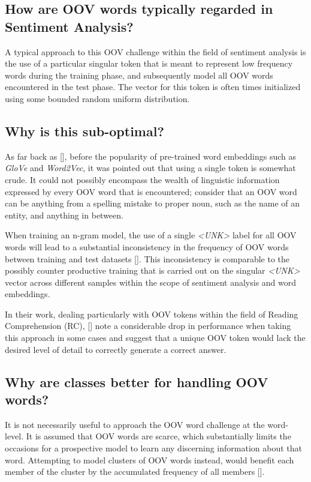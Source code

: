 \documentclass[12pt, a4paper]{report}
\newcommand{\unk}{\textit{\textless{UNK}\textgreater} }
\theoremstyle{definition}
\theoremstyle{definition}%
\theoremstyle{definition}%
\theoremstyle{definition}%
\theoremstyle{definition}%
\theoremstyle{definition}%
\renewcommand{\cite}[1]{[\citealp{#1}]}
\begin{document}
\subsection{How are OOV words typically regarded in Sentiment Analysis?}
A typical approach to this OOV challenge within the field of sentiment analysis is the use of a particular singular token that is meant to represent low frequency words during the training phase, and subsequently model all OOV words encountered in the test phase. The vector for this token is often times initialized using some bounded random uniform distribution.

\subsection{Why is this sub-optimal?}
As far back as \cite{gallwitz1996}, before the popularity of pre-trained word embeddings such as \textit{GloVe} and \textit{Word2Vec}, it was pointed out that using a single token is somewhat crude. It could not possibly encompass the wealth of linguistic information expressed by every OOV word that is encountered; consider that an OOV word can be anything from a spelling mistake to proper noun, such as the name of an entity, and anything in between.

When training an n-gram model, the use of a single \unk label for all OOV words will lead to a substantial inconsistency in the frequency of OOV words between training and test datasets \cite{gallwitz1996}. This inconsistency is comparable to the possibly counter productive training that is carried out on the singular \unk vector across different samples within the scope of sentiment analysis and word embeddings.

In their work, dealing particularly with OOV tokens within the field of Reading Comprehension (RC), \cite{bhuwandhingra2017} note a considerable drop in performance when taking this approach in some cases and suggest that a unique OOV token would lack the desired level of detail to correctly generate a correct answer.

\subsection{Why are classes better for handling OOV words?}
It is not necessarily useful to approach the OOV word challenge at the word-level. It is assumed that OOV words are scarce, which substantially limits the occasions for a prospective model to learn any discerning information about that word. Attempting to model clusters of OOV words instead, would benefit each member of the cluster by the accumulated frequency of all members \cite{naptali2012}.
\end{document}
